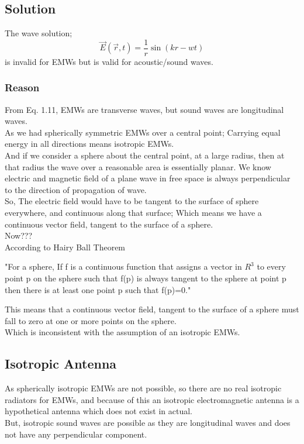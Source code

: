 \documentclass[a4paper, twoside] {thesis}
\begin{document}
\subsection{Solution}
The wave solution;\\
\begin{equation}
\vec{E}(\vec{r},t) = \frac{1}{r}\sin(kr-wt)
\end{equation}
is invalid for EMWs but is valid for acoustic/sound waves.\\

\subsubsection{Reason}
From Eq. 1.11, EMWs are transverse waves, but sound waves are longitudinal waves.\\
As we had spherically symmetric EMWs over a central point;
Carrying equal energy in all directions means isotropic EMWs.\\
And if we consider a sphere about the central point, at a large radius, then at that radius the wave over a reasonable area is essentially planar. We know electric and magnetic field of a plane wave in free space is always perpendicular to the direction of propagation of wave.\\
So, The electric field would have to be tangent to the surface of sphere everywhere, and continuous along that surface; Which means we have a continuous vector field, tangent to the surface of a sphere.\\
Now???\\
According to Hairy Ball Theorem
\begin{center}
	"For a sphere, If f is a continuous function that assigns a vector in $R^3$ to every point p on the sphere such that f(p) is always tangent to the sphere at point p then there is at least one point p such that f(p)=0."\\
\end{center}
This means that a continuous vector field, tangent to the surface of a sphere must fall to zero at one or more points on the sphere.\\
Which is inconsistent with the assumption of an isotropic EMWs.

\subsection{Isotropic Antenna}
As spherically isotropic EMWs are not possible, so there are no real isotropic radiators for EMWs, and because of this an isotropic electromagnetic antenna is a hypothetical antenna which does not exist in actual.\\
But, isotropic sound waves are possible as they are longitudinal waves and does not have any perpendicular component.
\end{document}

